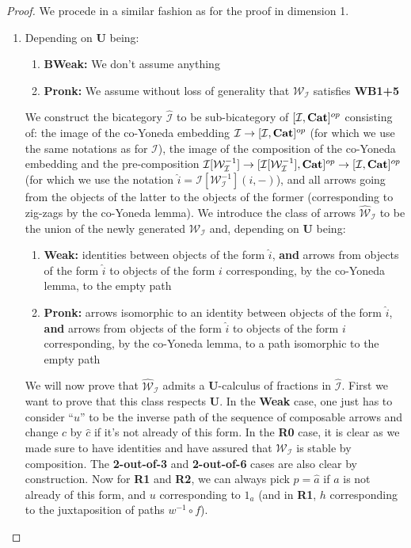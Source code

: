 \documentclass{article}
\numberwithin{equation}{section}
\theoremstyle{definition}
\theoremstyle{plain}
\newcommand{\Cat}{\textnormal{\textbf{Cat}}}
\begin{document}
\begin{proof} We procede in a similar fashion as for the proof in dimension 1.
\begin{enumerate}
\item[$(\Rightarrow)$]Depending on \textbf{U} being:
\begin{enumerate}[label = $\bullet$]
	\item \textbf{BWeak:} We don't assume anything
	\item \textbf{Pronk:} We assume without loss of generality that $\mathcal{W}_{\mathcal{I}}$ satisfies \textbf{WB1+5}
\end{enumerate}

We construct the bicategory $\widehat{\mathcal{I}}$ to be sub-bicategory of $[\mathcal{I}, \Cat]^{op}$ consisting of: the image of the co-Yoneda embedding $\mathcal{I} \to [\mathcal{I}, \Cat]^{op}$ (for which we use the same notations as for $\mathcal{I}$), the image of the composition of the co-Yoneda embedding and the pre-composition $\mathcal{I}[\mathcal{W}_{\mathcal{I}}^{-1}] \to [\mathcal{I}[\mathcal{W}_{\mathcal{I}}^{-1}], \Cat]^{op} \to [\mathcal{I}, \Cat]^{op}$ (for which we use the notation $\widehat{i} = \mathcal{I}[\mathcal{W}^{-1}_{\mathcal{I}}](i,-)$), and all arrows going from the objects of the latter to the objects of the former (corresponding to zig-zags by the co-Yoneda lemma). We introduce the class of arrows $\widehat{\mathcal{W}}_{\mathcal{I}}$ to be the union of the newly generated $\mathcal{W}_{\mathcal{I}}$ and, depending on \textbf{U} being:
\begin{enumerate}[label = $\bullet$]
	\item \textbf{Weak:} identities between objects of the form $\widehat{i}$, \textbf{and} arrows from objects of the form $\widehat{i}$ to objects of the form $i$ corresponding, by the co-Yoneda lemma, to the empty path
	\item \textbf{Pronk:} arrows isomorphic to an identity between objects of the form $\widehat{i}$, \textbf{and} arrows from objects of the form $\widehat{i}$ to objects of the form $i$ corresponding, by the co-Yoneda lemma, to a path isomorphic to the empty path
\end{enumerate}

We will now prove that $\widehat{\mathcal{W}}_{\mathcal{I}}$ admits a \textbf{U}-calculus of fractions in $\widehat{\mathcal{I}}$.  First we want to prove that this class respects \textbf{U}. In the \textbf{Weak} case, one just has to consider ``$u$'' to be the inverse path of the sequence of composable arrows and change $c$ by $\widehat{c}$ if it's not already of this form. In the \textbf{R0} case, it is clear as we made sure to have identities and have assured that $\mathcal{W}_{\mathcal{I}}$ is stable by composition. The \textbf{2-out-of-3} and \textbf{2-out-of-6} cases are also clear by construction. Now for \textbf{R1} and \textbf{R2}, we can always pick $p = \widehat{a}$ if $a$ is not already of this form, and $u$ corresponding to $1_a$ (and in \textbf{R1}, $h$ corresponding to the juxtaposition of paths $w^{-1}\circ f$).


\end{enumerate}
\end{proof}
\end{document}
